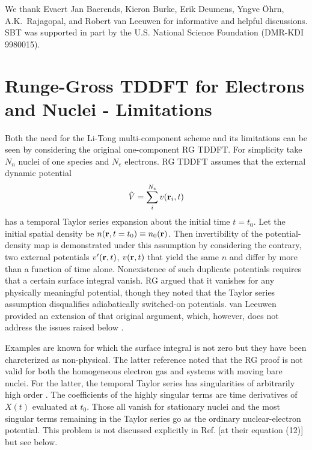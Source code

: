 We thank Evaert Jan Baerends, Kieron Burke, Erik Deumens, Yngve \"{O}hrn,
A.K.~Rajagopal, and Robert van Leeuwen for informative and helpful
discussions. SBT was supported in part by the U.S. National Science
Foundation (DMR-KDI 9980015).

\appendix 

\section{Runge-Gross TDDFT for Electrons and Nuclei - Limitations}

\noindent Both the need for the Li-Tong multi-component scheme and its
limitations can be seen by considering the original one-component RG TDDFT.
For simplicity take $N_n$ nuclei of one species and $N_e$ electrons. RG
TDDFT assumes that the external dynamic potential 
\begin{equation}
\hat V = \sum_{i}^{N_e} v({\bf r}_{i},t)  \label{VextofT}
\end{equation}
has a temporal Taylor series expansion about the initial time $t=t_{0}$. Let
the initial spatial density be $n({\bf r}, t=t_{0}) \equiv n_{0}({\bf r})$.
Then invertibility of the potential-density map is demonstrated under this
assumption by considering the contrary, two external potentials $v^{\prime}(%
{\bf r},t)$, $v({\bf r},t)$ that yield the same $n$ and differ by more than
a function of time alone. Nonexistence of such duplicate potentials requires
that a certain surface integral vanish. RG argued that it vanishes for any
physically meaningful potential, though they noted that the Taylor series
assumption disqualifies adiabatically switched-on potentials. van Leeuwen
provided an extension of that original argument, which, however, does not
address the issues raised below \cite{Leeuwen99}.

Examples are known for which the surface integral is not zero \cite{Xu85}
but they have been charcterized as non-physical\cite{Dhara87}. The latter
reference noted that the RG proof is not valid for both the homogeneous
electron gas \cite{HEGexample} and systems with moving bare nuclei. For the
latter, the temporal Taylor series has singularities of arbitrarily high
order \cite{bareTaylor}. The coefficients of the highly singular terms are
time derivatives of $X(t)$ evaluated at $t_{0}$. Those all vanish for
stationary nuclei and the most singular terms remaining in the Taylor series
go as the ordinary nuclear-electron potential. This problem is not discussed
explicitly in Ref. \cite{Saalmann96} [at their equation (12)] but see below.

